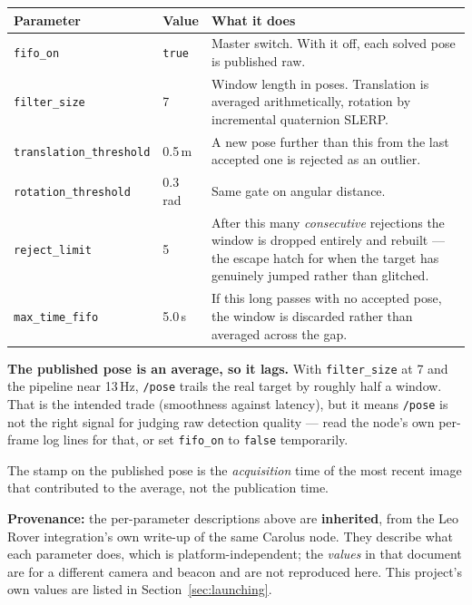 \documentclass[11pt]{report}
\newenvironment{warningbox}%
  {\begin{lrbox}{\warnbox}\begin{minipage}{0.90\textwidth}}%
  {\end{minipage}\end{lrbox}%
   \begin{center}\fcolorbox{black}{codebg}{\usebox{\warnbox}}\end{center}}
\begin{document}
\begin{center}
\begin{tabular}{p{}p{}p{}}
\toprule
Parameter & Value & What it does \\
\midrule
\texttt{fifo\_on} & \texttt{true} & Master switch. With it off, each solved pose is published raw. \\
\texttt{filter\_size} & 7 & Window length in poses. Translation is averaged arithmetically, rotation by incremental quaternion SLERP. \\
\texttt{translation\_threshold} & 0.5\,m & A new pose further than this from the last accepted one is rejected as an outlier. \\
\texttt{rotation\_threshold} & 0.3\,rad & Same gate on angular distance. \\
\texttt{reject\_limit} & 5 & After this many \emph{consecutive} rejections the window is dropped entirely and rebuilt --- the escape hatch for when the target has genuinely jumped rather than glitched. \\
\texttt{max\_time\_fifo} & 5.0\,s & If this long passes with no accepted pose, the window is discarded rather than averaged across the gap. \\
\bottomrule
\end{tabular}
\end{center}

\begin{warningbox}
\textbf{The published pose is an average, so it lags.} With
\texttt{filter\_size} at 7 and the pipeline near 13\,Hz, \texttt{/pose} trails
the real target by roughly half a window. That is the intended trade
(smoothness against latency), but it means \texttt{/pose} is not the right
signal for judging raw detection quality --- read the node's own per-frame
log lines for that, or set \texttt{fifo\_on} to \texttt{false} temporarily.

The stamp on the published pose is the \emph{acquisition} time of the most
recent image that contributed to the average, not the publication time.
\end{warningbox}

\textbf{Provenance:} the per-parameter descriptions above are
\textbf{inherited}, from the Leo Rover integration's own write-up of the same
Carolus node. They describe what each parameter does, which is
platform-independent; the \emph{values} in that document are for a different
camera and beacon and are not reproduced here. This project's own values are
listed in Section~\ref{sec:launching}.
\end{document}

